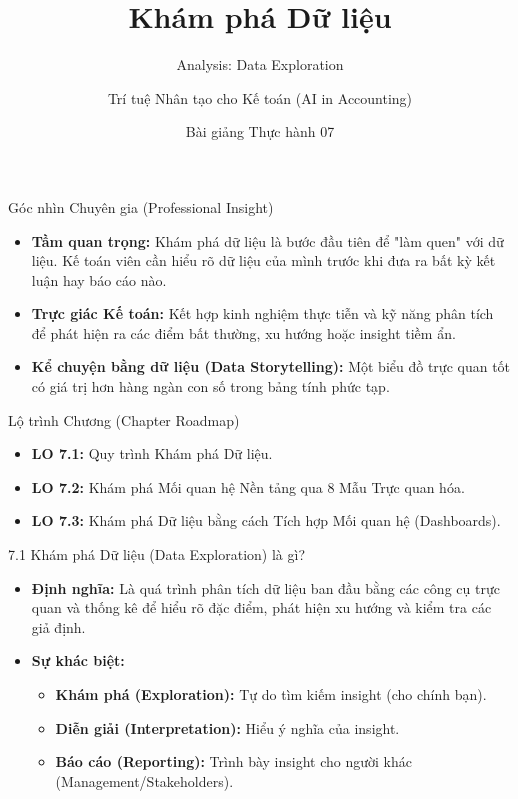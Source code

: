 \documentclass[aspectratio=169,12pt]{beamer}
\title[Thực hành - Chương 07]{Khám phá Dữ liệu}
\subtitle{Analysis: Data Exploration}
\author[Giảng viên]{Trí tuệ Nhân tạo cho Kế toán (AI in Accounting)}
\institute[Đại học]{Khoa Kế toán - Kiểm toán}
\date{Bài giảng Thực hành 07}
\begin{document}
\begin{frame}
    \titlepage
\end{frame}

\begin{frame}{Góc nhìn Chuyên gia (Professional Insight)}
\begin{itemize}
    \item \textbf{Tầm quan trọng:} Khám phá dữ liệu là bước đầu tiên để "làm quen" với dữ liệu. Kế toán viên cần hiểu rõ dữ liệu của mình trước khi đưa ra bất kỳ kết luận hay báo cáo nào.
    \item \textbf{Trực giác Kế toán:} Kết hợp kinh nghiệm thực tiễn và kỹ năng phân tích để phát hiện ra các điểm bất thường, xu hướng hoặc insight tiềm ẩn.
    \item \textbf{Kể chuyện bằng dữ liệu (Data Storytelling):} Một biểu đồ trực quan tốt có giá trị hơn hàng ngàn con số trong bảng tính phức tạp.
\end{itemize}
\end{frame}

\begin{frame}{Lộ trình Chương (Chapter Roadmap)}
\begin{itemize}
    \item \textbf{LO 7.1:} Quy trình Khám phá Dữ liệu.
    \item \textbf{LO 7.2:} Khám phá Mối quan hệ Nền tảng qua 8 Mẫu Trực quan hóa.
    \item \textbf{LO 7.3:} Khám phá Dữ liệu bằng cách Tích hợp Mối quan hệ (Dashboards).
\end{itemize}
\end{frame}

\begin{frame}{7.1 Khám phá Dữ liệu (Data Exploration) là gì?}
\begin{itemize}
    \item \textbf{Định nghĩa:} Là quá trình phân tích dữ liệu ban đầu bằng các công cụ trực quan và thống kê để hiểu rõ đặc điểm, phát hiện xu hướng và kiểm tra các giả định.
    \item \textbf{Sự khác biệt:}
    \begin{itemize}
        \item \textbf{Khám phá (Exploration):} Tự do tìm kiếm insight (cho chính bạn).
        \item \textbf{Diễn giải (Interpretation):} Hiểu ý nghĩa của insight.
        \item \textbf{Báo cáo (Reporting):} Trình bày insight cho người khác (Management/Stakeholders).
    \end{itemize}
\end{itemize}
\end{frame}
\end{document}
